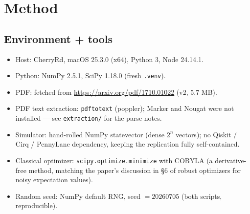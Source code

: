 \documentclass[11pt]{article}
\begin{document}
\section{Method}

\subsection{Environment + tools}
\begin{itemize}
  \item Host: CherryRd, macOS 25.3.0 (x64), Python 3, Node 24.14.1.
  \item Python: NumPy 2.5.1, SciPy 1.18.0 (fresh \texttt{.venv}).
  \item PDF: fetched from \url{https://arxiv.org/pdf/1710.01022} (v2, 5.7 MB).
  \item PDF text extraction: \texttt{pdftotext} (poppler); Marker and Nougat
        were not installed --- see \texttt{extraction/} for the parse notes.
  \item Simulator: hand-rolled NumPy statevector (dense $2^n$ vectors); no
        Qiskit / Cirq / PennyLane dependency, keeping the replication fully
        self-contained.
  \item Classical optimizer: \texttt{scipy.optimize.minimize} with COBYLA (a
        derivative-free method, matching the paper's discussion in \S 6 of
        robust optimizers for noisy expectation values).
  \item Random seed: NumPy default RNG, seed $= 20260705$
        (both scripts, reproducible).
\end{itemize}
\end{document}
